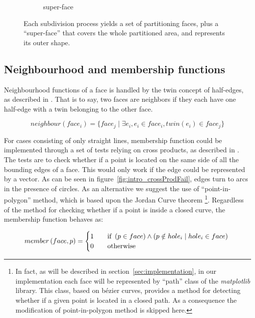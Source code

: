 \begin{figure}
\begin{subfigure}{.32\textwidth}
    \caption{super-face} \label{subfig:subd_superface_c}
  \end{subfigure}%
  \caption[xxx]
          {Each subdivision process yields a set of partitioning faces, plus a ``super-face'' that covers the whole partitioned area, and represents its outer shape.}
  \label{fig:subd_superface}
\end{figure}

\subsection{Neighbourhood and membership functions} \label{subsec:memberNeighbour}

Neighbourhood functions of a face is handled by the twin concept of half-edges, as described in \cite{de2000computational}.
That is to say, two faces are neighbors if they each have one half-edge with a twin belonging to the other face.

\[
neighbour\left(face_i\right) = \lbrace  face_j \mid \exists e_i, e_i \in face_i, \mathit{twin}(e_i) \in face_j \rbrace
\]

For cases consisting of only straight lines, membership function could be implemented through a set of tests relying on cross products, as described in \cite{de2000computational}.
The tests are to check whether if a point is located on the same side of all the bounding edges of a face.
This would only work if the edge could be represented by a vector.
As can be seen in figure~\ref{fig:intro_crossProdFail}, edges turn to arcs in the presence of circles.
As an alternative we suggest the use of ``point-in-polygon'' method, which is based upon the Jordan Curve theorem \footnote{In fact, as will be described in section~\ref{sec:implementation}, in our implementation each face will be represented by ``path'' class of the \emph{matplotlib} library. This class, based on b\'ezier curves, provides a method for detecting whether if a given point is located in a closed path. As a consequence the modification of point-in-polygon method is skipped here.}.
Regardless of the method for checking whether if a point is inside a closed curve, the membership function behaves as:

\[
member\left(face,p\right) =
\begin{cases}
  1 & \quad \text{if } \left(p \in face\right) \land \left(p \notin hole_i \mid hole_i \in face\right) \\
  0 & \quad \text{otherwise} \\
\end{cases}\\
\]

